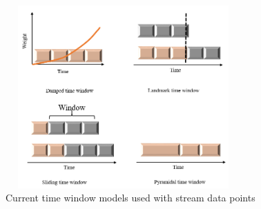 
\begin{figure}[!ht]
\centering
\includegraphics[width = 9cm,height = 7cm]{image/timeW.PNG}
\caption{Current time window models used with stream data points \protect\cite{carnein2019optimizing}}
\label{time1}
\end{figure}





